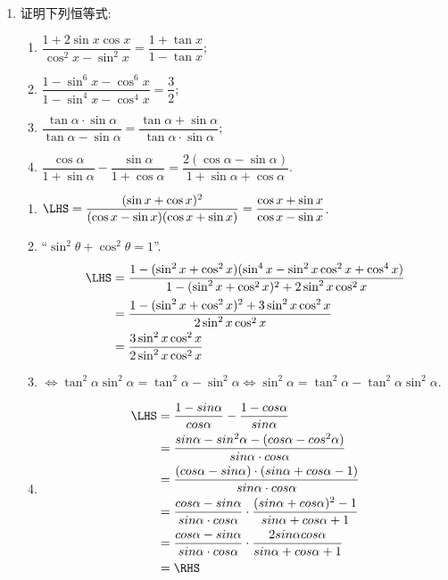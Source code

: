 \begin{enumerate}
\item 证明下列恒等式: 
\begin{enumerate}[(1)]
\item $\dfrac{1+2\sin{x}\cos{x}}{\cos^2x-\sin^2x}=\dfrac{1+\tan{x}}{1-\tan{x}}$; 
\item $\dfrac{1-\sin^6x-\cos^6x}{1-\sin^4x-\cos^4x}=\dfrac{3}{2}$;
\item $\dfrac{\tan\alpha\cdot\sin\alpha}{\tan\alpha-\sin\alpha}=\dfrac{\tan\alpha+\sin\alpha}{\tan\alpha\cdot\sin\alpha}$; 
\item $\dfrac{\cos\alpha}{1+\sin\alpha}-\dfrac{\sin\alpha}{1+\cos\alpha}=\dfrac{2(\cos\alpha-\sin\alpha)}{1+\sin\alpha+\cos\alpha}$. 
\end{enumerate}
\begin{jieda}
\begin{enumerate}[(1)]
\item $\LHS=\dfrac{(\sin{x}+\cos{x})^2}{(\cos{x}-\sin{x})(\cos{x}+\sin{x})}=\dfrac{\cos{x}+\sin{x}}{\cos{x}-\sin{x}}$. 

\item ``$\sin^2\theta+\cos^2\theta=1$''. 
\begin{align*}
\LHS & = \dfrac{1-(\sin^2x+\cos^2x)(\sin^4x-\sin^2x\cos^2x+\cos^4x)}{1-(\sin^2x+\cos^2x)^2+2\sin^2x\cos^2x}\\
& = \dfrac{1-(\sin^2x+\cos^2x)^2+3\sin^2x\cos^2x}{2\sin^2x\cos^2x}\\
& = \dfrac{3\sin^2x\cos^2x}{2\sin^2x\cos^2x}
\end{align*}

\item $\iff\tan^2\alpha\sin^2\alpha=\tan^2\alpha-\sin^2\alpha\iff\sin^2\alpha=\tan^2\alpha-\tan^2\alpha\sin^2\alpha$. 

\item 
\begin{align*}
\LHS & = \dfrac{1-sin\alpha}{cos\alpha} - \dfrac{1-cos\alpha}{sin\alpha} \\
& = \dfrac{sin\alpha - sin^2\alpha - (cos\alpha - cos^2\alpha)}{sin\alpha \cdot cos\alpha} \\
& = \dfrac{(cos\alpha - sin\alpha) \cdot (sin\alpha + cos\alpha - 1)}{sin\alpha \cdot cos\alpha} \\
& = \dfrac{cos\alpha - sin\alpha}{sin\alpha \cdot cos\alpha} \cdot \dfrac{(sin\alpha + cos\alpha)^2 - 1}{sin\alpha + cos\alpha + 1} \\
& = \dfrac{cos\alpha - sin\alpha}{sin\alpha \cdot cos\alpha} \cdot \dfrac{2sin\alpha cos\alpha}{sin\alpha + cos\alpha + 1} \\
& = \RHS
\end{align*}
\end{enumerate}
\end{jieda}



\end{enumerate}
